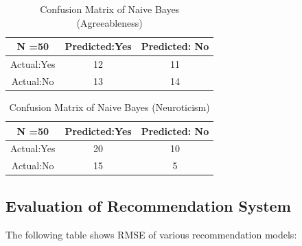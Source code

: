 \begin{table}[!ht]
\centering
\begin{tabular}{ |c|c|c| }
 \hline
 N =50 & Predicted:Yes & Predicted: No \\
 \hline
 Actual:Yes&12 & 11 \\
 \hline
 Actual:No&13 & 14 \\
 \hline
\end{tabular}
 \caption{Confusion Matrix of Naive Bayes (Agreeableness)}
\end{table}

\begin{table}[!ht]
\centering
\begin{tabular}{ |c|c|c| }
 \hline
 N =50 & Predicted:Yes & Predicted: No \\
 \hline
 Actual:Yes&20 & 10 \\
 \hline
 Actual:No&15 & 5 \\
 \hline
\end{tabular}
 \caption{Confusion Matrix of Naive Bayes (Neuroticism)}
\end{table}


\subsection{Evaluation of Recommendation System}
The following table shows RMSE of various recommendation models:

